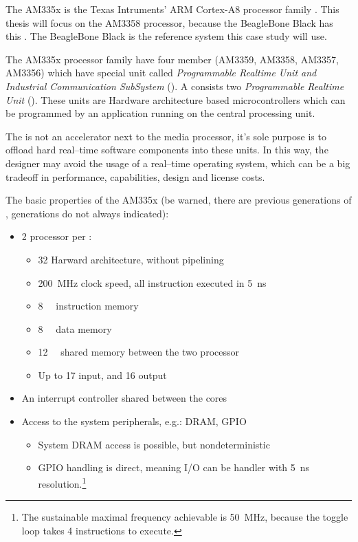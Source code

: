 The AM335x is the Texas Intruments' ARM Cortex-A8 processor family \citep{AM335x}. This thesis will focus on the AM3358 processor, because the BeagleBone Black \citep{BBB} has this \cpu. The BeagleBone Black is the reference system this case study will use.

The AM335x processor family have four member (AM3359, AM3358, AM3357, AM3356) which have special unit called \emph{Programmable Realtime Unit and Industrial Communication SubSystem} (\pruss). A \pruss consists two \emph{Programmable Realtime Unit} (\pru). These units are Hardware architecture based microcontrollers which can be programmed by an application running on the central processing unit.

The \pru is not an accelerator next to the media processor, it's sole purpose is to offload hard real--time software components into these units. In this way, the designer may avoid the usage of a real--time operating system, which can be a big tradeoff in performance, capabilities, design and license costs.

The basic properties of the AM335x \pruss (be warned, there are previous generations of \pruss, generations do not always indicated):
\begin{itemize}
	\item 2 \pru processor per \pruss:
	\begin{itemize}
		\item \SI{32}{\bit} Harward architecture, without pipelining
		\item \SI{200}{\mega\hertz} clock speed, all instruction executed in \SI{5}{\nano\second}
		\item \SI{8}{\kilo\byte} instruction memory
		\item \SI{8}{\kilo\byte} data memory
		\item \SI{12}{\kilo\byte} shared memory between the two processor
		\item Up to 17 input, and 16 output
	\end{itemize}
	\item An interrupt controller shared between the \pru cores
	\item Access to the system peripherals, e.g.: DRAM, GPIO
	\begin{itemize}
		\item System DRAM access is possible, but nondeterministic
		\item GPIO handling is direct, meaning I/O can be handler with \SI{5}{\nano\second} resolution.\footnote{The sustainable maximal frequency achievable is \SI{50}{\mega\hertz}, because the toggle loop takes 4 instructions to execute.}
	\end{itemize}
\end{itemize}

